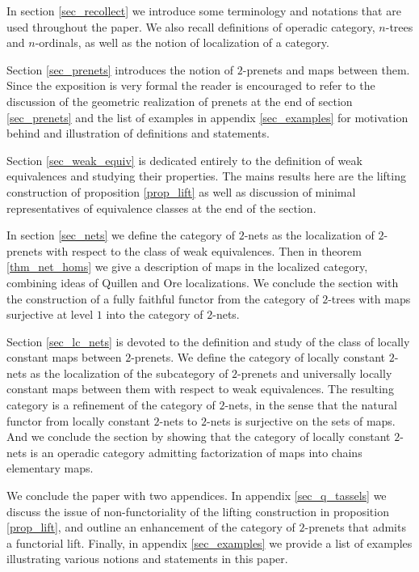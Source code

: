 \documentclass[letterpaper,12pt,leqno]{article}
\numberwithin{equation}{theorem}
\begin{document}
\begin{nparagraph}
In section \ref{sec_recollect} we introduce some terminology and notations that are used throughout the paper. We also recall definitions of operadic category, $n$-trees and $n$-ordinals,
as well as the notion of localization of a category.

Section \ref{sec_prenets} introduces the notion of $2$-prenets and maps between them. Since the exposition is very formal the reader is encouraged to refer to the discussion of the
geometric realization of prenets at the end of section \ref{sec_prenets} and the list of examples in appendix \ref{sec_examples} for motivation behind and illustration of definitions
and statements.

Section \ref{sec_weak_equiv} is dedicated entirely to the definition of weak equivalences and studying their properties. The mains results here are the lifting construction of
proposition \ref{prop_lift} as well as discussion of minimal representatives of equivalence classes at the end of the section.

In section \ref{sec_nets} we define the category of $2$-nets as the localization of $2$-prenets with respect to the class of weak equivalences. Then in theorem \ref{thm_net_homs}
we give a description of maps in the localized category, combining ideas of Quillen and Ore localizations. We conclude the section with the construction of a fully faithful functor
from the category of $2$-trees with maps surjective at level $1$ into the category of $2$-nets.

Section \ref{sec_lc_nets} is devoted to the definition and study of the class of locally constant maps between $2$-prenets. We define the category of locally constant $2$-nets as
the localization of the subcategory of $2$-prenets and universally locally constant maps between them with respect to weak equivalences. The resulting category is a refinement
of the category of $2$-nets, in the sense that the natural functor from locally constant $2$-nets to $2$-nets is surjective on the sets of maps. And we conclude the section
by showing that the category of locally constant $2$-nets is an operadic category admitting factorization of maps into chains elementary maps.

We conclude the paper with two appendices. In appendix \ref{sec_q_tassels} we discuss the issue of non-functoriality of the lifting construction in proposition \ref{prop_lift},
and outline an enhancement of the category of $2$-prenets that admits a functorial lift. Finally, in appendix \ref{sec_examples} we provide a list of examples illustrating various
notions and statements in this paper.

\end{nparagraph}
\end{document}
